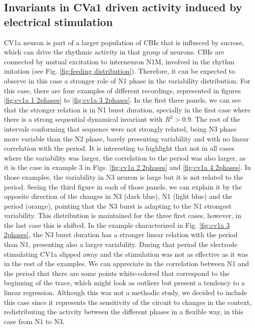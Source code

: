 \subsection{Invariants in CVa1 driven activity induced by electrical stimulation}
CV1a neuron is part of a larger population of CBIs that is influeced by sucrose, which can drive the rhythmic activity in that group of neurons. CBIs are connected by mutual excitation to interneuron N1M, involved in the rhythm initation (see Fig. \ref{fig:feeding distribution}). Therefore, it can be expected to observe in this case a stronger role of N1 phase in the variability distribution. For this case, there are four examples of different recordings, represented in figures \ref{fig:cv1a 1 2phases} to \ref{fig:cv1a 3 2phases}. In the first three panels, we can see that the stronger relation is in N1 burst duration, specially in the first case where there is a strong sequential dynamical invariant with $R^2>0.9$. The rest of the intervals conforming that sequence were not strongly related, being N3 phase more variable than the N2 phase, barely presenting variability and with no linear correlation with the period. It is interesting to highlight that not in all cases where the variability was larger, the correlation to the period was also larger, as it is the case in example 3 in Figs. \ref{fig:cv1a 2 2phases} and \ref{fig:cv1a 4 2phases}. In those examples, the variability in N3 neuron is large but it is not related to the period. Seeing the third figure in each of those panels, we can explain it by the opposite direction of the changes in N3 (dark blue),  N1 (light blue) and the period (orange), pointing that the N3 burst is adapting to the N1 strongest variability. This distribution is maintained for the three first cases, however, in the last case this is shifted. In the example characterized in Fig. \ref{fig:cv1a 3 2phases}, the N3 burst duration has a stronger linear relation with the period than N1, presenting also a larger variability. During that period the electrode stimulating CV1a slipped away and the stimulation was not as effective as it was in the rest of the examples. We can appreciate in the correlation between N1 and the period that there are some points white-colored that correspond to the beginning of the trace, which might look as outliers but present a tendency to a linear regression.  Although this was not a methodic study, we decided to include this case since it represents the sensitivity of the circuit to changes in the context, redistributing the activity between the different phases in a flexible way, in this case from N1 to N3.

